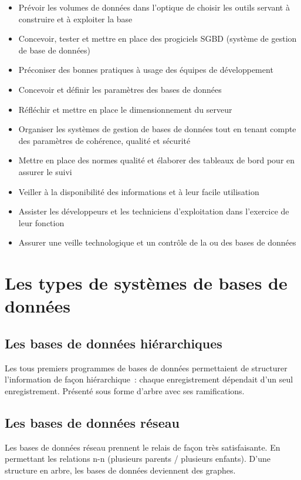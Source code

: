 \documentclass[12pt,a4paper]{report}
\begin{document}
\begin{itemize}[leftmargin=*]
  \item Prévoir les volumes de données dans l'optique de choisir les outils
        servant à construire et à exploiter la base
  \item Concevoir, tester et mettre en place des progiciels SGBD (système de
        gestion de base de données)
  \item Préconiser des bonnes pratiques à usage des équipes de développement
  \item Concevoir et définir les paramètres des bases de données
  \item Réfléchir et mettre en place le dimensionnement du serveur
  \item Organiser les systèmes de gestion de bases de données tout en tenant
        compte des paramètres de cohérence, qualité et sécurité
  \item Mettre en place des normes qualité et élaborer des tableaux de bord
        pour en assurer le suivi
  \item Veiller à la disponibilité des informations et à leur facile utilisation
  \item Assister les développeurs et les techniciens d'exploitation dans
        l'exercice de leur fonction
  \item Assurer une veille technologique et un contrôle de la ou des bases
        de données
\end{itemize}

\section{Les types de systèmes de bases de données}

\subsection{Les bases de données hiérarchiques}

Les tous premiers programmes de bases de données permettaient de structurer
l'information de façon hiérarchique~: chaque enregistrement dépendait d'un seul
enregistrement. Présenté sous forme d'arbre avec ses ramifications.

\subsection{Les bases de données réseau}

Les bases de données réseau prennent le relais de façon très satisfaisante. En
permettant les relations n-n (plusieurs parents / plusieurs enfants). D'une
structure en arbre, les bases de données deviennent des graphes.
\end{document}

